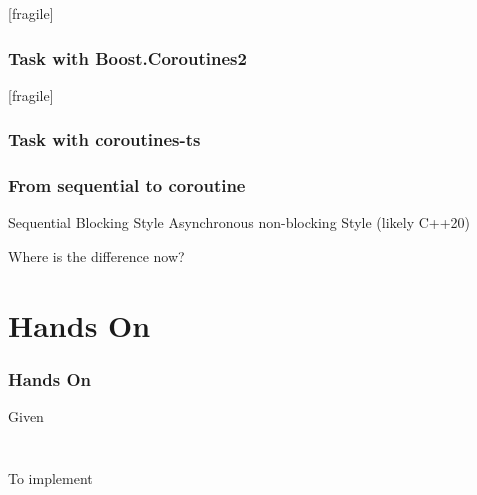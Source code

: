 \begin{frame}{[fragile]}
	\frametitle{Task with Boost.Coroutines2}
\end{frame}%
\begin{frame}{[fragile]}
	\frametitle{Task with coroutines-ts}
\end{frame}%

\begin{frame}[fragile]
	\frametitle{From sequential to coroutine}
	Sequential Blocking Style
	\vspace{8mm}
	Asynchronous non-blocking Style (likely C++20)
	\vspace{8mm}

	Where is the difference now?
\end{frame}

\section{Hands On}
\begin{frame}[fragile]
	\frametitle{Hands On}

	{\large Given}
	\inputminted[fontsize=\scriptsize,firstline=6]{cpp}{../dojo/first/http_client.h}
	\inputminted[fontsize=\scriptsize,firstline=12,lastline=16]{cpp}{../dojo/first/sync/http_client.h}
	\vspace{5mm}
	{\large To implement}
	\inputminted[fontsize=\scriptsize,firstline=18,lastline=20]{cpp}{../dojo/first/sync/http_client.h}
\end{frame}
